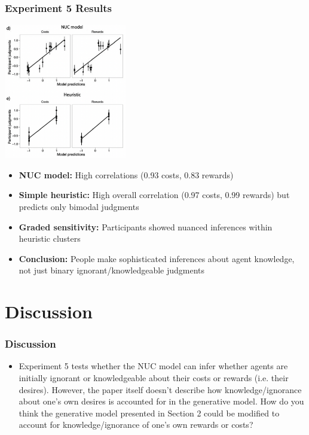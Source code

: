 \documentclass{beamer}
\begin{document}
\begin{frame}
\frametitle{Experiment 5 Results}
\begin{center}
\includegraphics[width=0.4\textwidth]{results_5.png}
\end{center}

\vspace{0.05cm}
\begin{itemize}
    \item \textbf{NUC model:} High correlations (0.93 costs, 0.83 rewards)
    \item \textbf{Simple heuristic:} High overall correlation (0.97 costs, 0.99 rewards) but predicts only bimodal judgments
    \item \textbf{Graded sensitivity:} Participants showed nuanced inferences within heuristic clusters
    \item \textbf{Conclusion:} People make sophisticated inferences about agent knowledge, not just binary ignorant/knowledgeable judgments
\end{itemize}

\end{frame}


\section{Discussion}
\begin{frame}
\frametitle{Discussion}
\begin{itemize}
    \item Experiment 5 tests whether the NUC model can infer whether agents are initially ignorant or knowledgeable about their costs or rewards (i.e. their desires). However, the paper itself doesn't describe how knowledge/ignorance about one's own desires is accounted for in the generative model. How do you think the generative model presented in Section 2 could be modified to account for knowledge/ignorance of one's own rewards or costs?
\end{itemize}
\end{frame}
\end{document}
